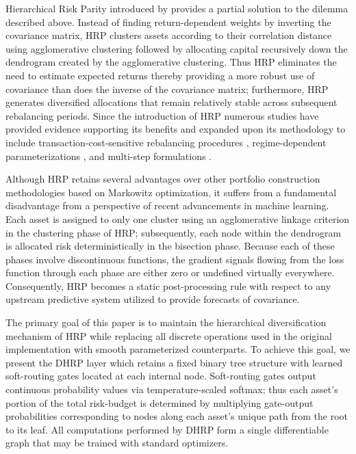 Hierarchical Risk Parity introduced by \citet{LopezdePrado2016} provides a partial solution to the dilemma described above. Instead of finding return-dependent weights by inverting the covariance matrix, HRP clusters assets according to their correlation distance using agglomerative clustering followed by allocating capital recursively down the dendrogram created by the agglomerative clustering. Thus HRP eliminates the need to estimate expected returns thereby providing a more robust use of covariance than does the inverse of the covariance matrix; furthermore, HRP generates diversified allocations that remain relatively stable across subsequent rebalancing periods. Since the introduction of HRP numerous studies have provided evidence supporting its benefits and expanded upon its methodology to include transaction-cost-sensitive rebalancing procedures \citep{Roncalli2013}, regime-dependent parameterizations \citep{Raffinot2018}, and multi-step formulations \citep{Roncalli2013}.

Although HRP retains several advantages over other portfolio construction methodologies based on Markowitz optimization, it suffers from a fundamental disadvantage from a perspective of recent advancements in machine learning. Each asset is assigned to only one cluster using an agglomerative linkage criterion in the clustering phase of HRP; subsequently, each node within the dendrogram is allocated risk deterministically in the bisection phase. Because each of these phases involve discontinuous functions, the gradient signals flowing from the loss function through each phase are either zero or undefined virtually everywhere. Consequently, HRP becomes a static post-processing rule with respect to any upstream predictive system utilized to provide forecasts of covariance.

The primary goal of this paper is to maintain the hierarchical diversification mechanism of HRP while replacing all discrete operations used in the original implementation with smooth parameterized counterparts. To achieve this goal, we present the DHRP layer which retains a fixed binary tree structure with learned soft-routing gates located at each internal node. Soft-routing gates output continuous probability values via temperature-scaled softmax; thus each asset's portion of the total risk-budget is determined by multiplying gate-output probabilities corresponding to nodes along each asset's unique path from the root to its leaf. All computations performed by DHRP form a single differentiable graph that may be trained with standard optimizers.

